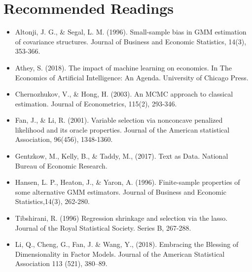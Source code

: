 \documentclass[11pt]{article}
\begin{document}
\section*{Recommended Readings}
\begin{itemize}
\item Altonji, J. G., \& Segal, L. M. (1996). Small-sample bias in GMM estimation of covariance structures. Journal of Business and Economic Statistics, 14(3), 353-366. 
\item Athey, S. (2018). The impact of machine learning on economics. In The Economics of Artificial Intelligence: An Agenda. University of Chicago Press.
\item Chernozhukov, V., \& Hong, H. (2003). An MCMC approach to classical estimation. Journal of Econometrics, 115(2), 293-346. 
\item Fan, J., \& Li, R. (2001). Variable selection via nonconcave penalized likelihood and its oracle properties. Journal of the American statistical Association, 96(456), 1348-1360.
\item Gentzkow, M., Kelly, B., \& Taddy, M., (2017). Text as Data. National Bureau of
Economic Research.
\item Hansen, L. P., Heaton, J., \& Yaron, A. (1996). Finite-sample properties of some alternative GMM estimators. Journal of Business and Economic Statistics,14(3), 262-280. 
\item Tibshirani, R. (1996) Regression shrinkage and selection via the lasso. Journal of the Royal Statistical Society. Series B, 267-288. 
\item Li, Q., Cheng, G., Fan, J. \& Wang, Y., (2018). Embracing the Blessing of Dimensionality in Factor Models. Journal of the American Statistical Association 113 (521), 380–89.

\end{itemize}
\end{document}
